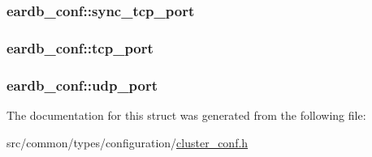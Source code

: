 \subsubsection[{\texorpdfstring{sync\+\_\+tcp\+\_\+port}{sync_tcp_port}}]{ eardb\+\_\+conf\+::sync\+\_\+tcp\+\_\+port}\hypertarget{structeardb__conf_a0095734eaf046566c32410266470faa2}{}\label{structeardb__conf_a0095734eaf046566c32410266470faa2}
\subsubsection[{\texorpdfstring{tcp\+\_\+port}{tcp_port}}]{ eardb\+\_\+conf\+::tcp\+\_\+port}\hypertarget{structeardb__conf_af4823cf78232f931cc656abcaa419422}{}\label{structeardb__conf_af4823cf78232f931cc656abcaa419422}
\subsubsection[{\texorpdfstring{udp\+\_\+port}{udp_port}}]{ eardb\+\_\+conf\+::udp\+\_\+port}\hypertarget{structeardb__conf_ae436b735136399150cf5af7cdddd4bd4}{}\label{structeardb__conf_ae436b735136399150cf5af7cdddd4bd4}


The documentation for this struct was generated from the following file\+:\begin{DoxyCompactItemize}
\item 
src/common/types/configuration/\hyperlink{cluster__conf_8h}{cluster\+\_\+conf.\+h}\end{DoxyCompactItemize}
